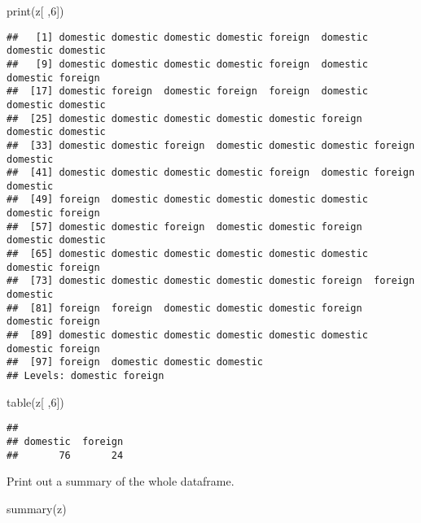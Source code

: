 \documentclass[
]{article}
\newenvironment{Shaded}{\begin{snugshade}}{\end{snugshade}}
\newcommand{\DecValTok}[1]{\textcolor[rgb]{0.00,0.00,0.81}{#1}}
\newcommand{\FunctionTok}[1]{\textcolor[rgb]{0.00,0.00,0.00}{#1}}
\newcommand{\NormalTok}[1]{#1}
\begin{document}
\begin{Shaded}
\begin{Highlighting}[]
\FunctionTok{print}\NormalTok{(z[ ,}\DecValTok{6}\NormalTok{])}
\end{Highlighting}
\end{Shaded}

\begin{verbatim}
##   [1] domestic domestic domestic domestic foreign  domestic domestic domestic
##   [9] domestic domestic domestic domestic foreign  domestic domestic foreign 
##  [17] domestic foreign  domestic foreign  foreign  domestic domestic domestic
##  [25] domestic domestic domestic domestic domestic foreign  domestic domestic
##  [33] domestic domestic foreign  domestic domestic domestic foreign  domestic
##  [41] domestic domestic domestic domestic foreign  domestic foreign  domestic
##  [49] foreign  domestic domestic domestic domestic domestic domestic foreign 
##  [57] domestic domestic foreign  domestic domestic foreign  domestic domestic
##  [65] domestic domestic domestic domestic domestic domestic domestic foreign 
##  [73] domestic domestic domestic domestic domestic foreign  foreign  domestic
##  [81] foreign  foreign  domestic domestic domestic foreign  domestic foreign 
##  [89] domestic domestic domestic domestic domestic domestic domestic foreign 
##  [97] foreign  domestic domestic domestic
## Levels: domestic foreign
\end{verbatim}

\begin{Shaded}
\begin{Highlighting}[]
\FunctionTok{table}\NormalTok{(z[ ,}\DecValTok{6}\NormalTok{])}
\end{Highlighting}
\end{Shaded}

\begin{verbatim}
## 
## domestic  foreign 
##       76       24
\end{verbatim}

Print out a summary of the whole dataframe.

\begin{Shaded}
\begin{Highlighting}[]
\FunctionTok{summary}\NormalTok{(z)}
\end{Highlighting}
\end{Shaded}
\end{document}
